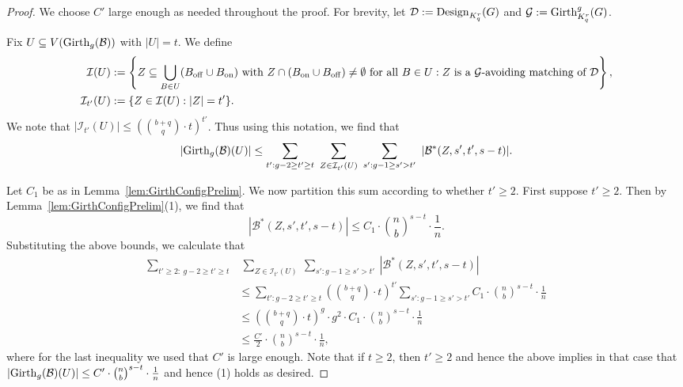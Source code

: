 \documentclass[11pt]{article}
\newcommand{\mc}[1]{\mathcal{#1}}
\newcounter{i}
\theoremstyle{plain}
\theoremstyle{plain} %
\theoremstyle{definition}
\begin{document}
\begin{proof}
We choose $C'$ large enough as needed throughout the proof. For brevity, let $\mc{D}:={\rm Design}_{K_q^r}(G)$ and $\mc{G}:= {\rm Girth}_{K_q^r}^g(G)$. 

Fix $U\subseteq V({\rm Girth}_g(\mc{B}))$ with $|U|=t$. We define
\begin{align*}
\mc{I}(U) &:= \left\{Z\subseteq \bigcup_{B\in U} (B_{\rm off}\cup B_{\rm on}) \text{ with } Z\cap ( B_{\rm on}\cup B_{\rm off}) \ne \emptyset \text{ for all } B\in U: Z\text{ is a } \mc{G}\text{-avoiding matching of } \mc{D}\right\},\\
\mc{I}_{t'}(U) &:= \{Z\in \mc{I}(U): |Z|=t'\}.    
\end{align*}
We note that $|\mc{I}_{t'}(U)|\le \left(\binom{b+q}{q}\cdot t\right)^{t'}$. Thus using this notation, we find that
$$|{\rm Girth}_g(\mc{B})(U)| \le \sum_{t': g-2\ge t' \ge t} ~\sum_{Z\in \mc{I}_{t'}(U)}~\sum_{s': g-1\ge s' > t'}~|\mc{B}^{*}(Z,s',t',s-t)|.$$

Let $C_1$ be as in Lemma~\ref{lem:GirthConfigPrelim}. We now partition this sum according to whether $t'\ge 2$. First suppose $t'\ge 2$. Then by Lemma~\ref{lem:GirthConfigPrelim}(1), we find that
$$|\mc{B}^{*}(Z,s',t',s-t)|\le C_1\cdot \binom{n}{b}^{s-t}\cdot \frac{1}{n}.$$
Substituting the above bounds, we calculate that
\begin{align*}
\sum_{t'\ge 2:~g-2\ge t' \ge t} &~\sum_{Z\in \mc{I}_{t'}(U)}~\sum_{s': g-1\ge s' > t'}~|\mc{B}^{*}(Z,s',t',s-t)| \\
&\le \sum_{t': g-2\ge t' \ge t} \left(\binom{b+q}{q}\cdot t\right)^{t'} \sum_{s': g-1\ge s' > t'} C_1\cdot \binom{n}{b}^{s-t}\cdot \frac{1}{n} \\  
&\le \left(\binom{b+q}{q}\cdot t\right)^{g} \cdot g^2 \cdot C_1\cdot \binom{n}{b}^{s-t}\cdot \frac{1}{n}\\
&\le \frac{C'}{2}\cdot \binom{n}{b}^{s-t}\cdot \frac{1}{n},
\end{align*}
where for the last inequality we used that $C'$ is large enough. Note that if $t\ge 2$, then $t' \ge 2$ and hence the above implies in that case that $|{\rm Girth}_g(\mc{B})(U)|\le C' \cdot \binom{n}{b}^{s-t}\cdot \frac{1}{n}$ and hence (1) holds as desired.


\end{proof}
\end{document}
